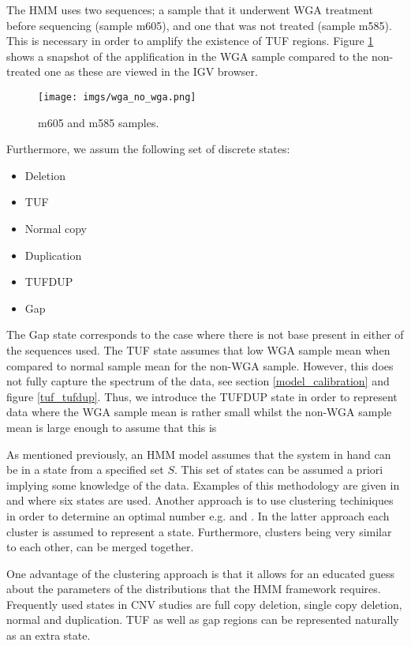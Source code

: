 The HMM uses two sequences; a sample that it underwent WGA treatment before sequencing (sample  m605), and  one that was not treated (sample m585). 
This is necessary in order to amplify the existence of TUF regions. 
Figure \ref{wga_no_wga } shows a snapshot of the applification in the WGA sample compared to the non-treated one as these are viewed in the IGV browser.


\begin{figure}[!htb]
	\begin{center}
		\texttt{[image: imgs/wga\_no\_wga.png]}
	\end{center}
	\caption{m605 and m585 samples.}
	\label{wga_no_wga }
\end{figure}

Furthermore, we assum the following set of discrete states:

\begin{itemize}
	\item Deletion
	\item TUF
	\item Normal copy
	\item Duplication
	\item TUFDUP
	\item Gap
\end{itemize}

The Gap state  corresponds to the case where there is not base present in either of the sequences used. The TUF state assumes that low WGA sample mean when compared to normal sample mean for the non-WGA sample. However, this does not fully capture the spectrum of the data, see section \ref{model_calibration} and figure \ref{tuf_tufdup}.  Thus, we introduce the  TUFDUP state in order to represent data where the WGA sample mean is rather small whilst the non-WGA sample mean is large enough to assume that this is

As mentioned previously, an HMM model assumes that the system in hand can be in a state from a specified set $S$. This set of states can be assumed a priori implying some knowledge of the data. Examples of this methodology are given in \cite{coella2007} and \cite{Wang2007}  where six states are used. 
Another approach is to use clustering techiniques in order to determine an optimal number e.g. \cite{fridlyand2004} and \cite{liu2017}. In the latter approach each cluster is assumed to represent a state. Furthermore, clusters being very similar to each other, can be merged together.  

One advantage of the clustering approach is that it allows for an educated guess about the parameters of the distributions that the HMM framework requires. Frequently used states in CNV studies are full copy deletion, single copy deletion, normal and duplication. TUF as well as gap regions can be represented naturally as an extra state. 

